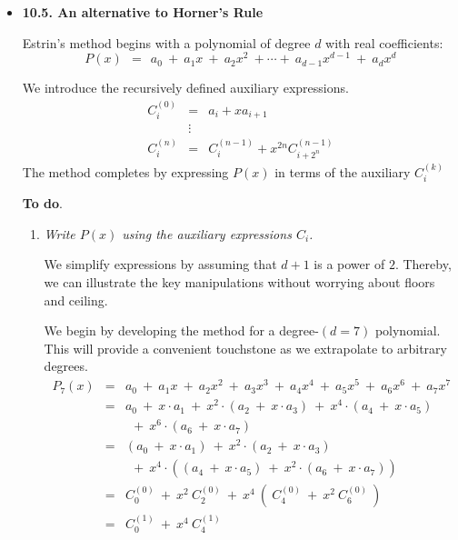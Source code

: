 
\begin{itemize}
\item {\bf 10.5. An alternative to Horner's Rule}

\smallskip

Estrin's method begins with a polynomial of degree $d$ with real coefficients:
\[
P(x) \ \ = \ \ a_0 \ + \ a_1 x \ + \ a_2 x^2 \ + \cdots + \ a_{d-1} x^{d-1} \ + \ a_d x^d
\]

We introduce the recursively defined auxiliary expressions.  
\begin{eqnarray*}
C_i^{(0)} & = & a_i + x a_{i+1} \\
                &\vdots &  \\
C_i^{(n)}  & = & C_i^{(n-1)} + x^{2n} C_{i+2^n}^{(n-1)}
\end{eqnarray*}
The method completes by expressing $P(x)$ in terms of the auxiliary $C_i^{(k)}$

\medskip

{\bf To do}.
\begin{enumerate}
\item
{\em Write $P(x)$ using the auxiliary expressions $C_i$.}  

\smallskip

We simplify expressions by assuming that $d+1$ is a power of $2$.  Thereby, we can illustrate the key manipulations without worrying about floors and ceiling.

\smallskip

We begin by developing the method for a degree-$(d=7)$ polynomial.  This will provide a convenient touchstone as we extrapolate to arbitrary degrees.
\begin{eqnarray*}
P_7(x) & = & a_0 \ + \ a_1 x \ + \ a_2 x^2 \ + \ a_{3} x^{3} \ + \ a_4 x^4 \ + \ a_{5} x^{5} \ + \ a_{6} x^{6} \ + \ a_7 x^7 \\
           & = & a_0 \ + \ x \cdot a_1 \ + \ x^2 \cdot (a_2 \ + \ x \cdot a_3) \ + \ x^4 \cdot (a_4 \ + \ x \cdot a_5) \\
           &  &  \ \ + \ x^6 \cdot (a_6 \ + \ x \cdot a_7) \\
          & = & (a_0 \ + \ x \cdot a_1) \ + \ x^2 \cdot (a_2 \ + \ x \cdot a_3) \\
           & & \ \ + \ x^4 \cdot \left( (a_4 \ + \ x \cdot a_5) \ + \ x^2 \cdot (a_6 \ + \ x \cdot a_7) \right) \\
          & = & C_{0}^{(0)} \ + \ x^2 \ C_2^{(0)} \ + \ x^4 \ ( \ C_4^{(0)} \ + \ x^2 \ C_{6}^{(0)} \ ) \\
          & = & C_0^{(1)} \ + \ x^4 \ C_4^{(1)} 
\end{eqnarray*}


\end{enumerate}
\end{itemize}
